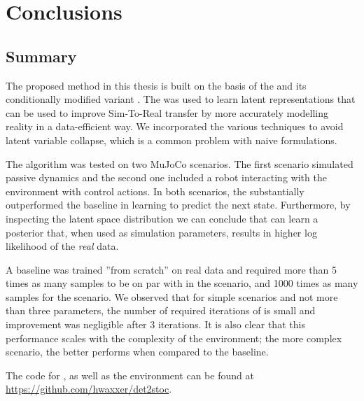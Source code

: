 \chapter{Conclusions}
\label{conclusions}

\section{Summary}

The proposed method in this thesis is built on the basis of the \vae{} and its conditionally modified variant \cvae{}. The \cvae{} was used to learn latent representations that can be used to improve Sim-To-Real transfer by more accurately modelling reality in a data-efficient way. We incorporated the various techniques to avoid latent variable collapse, which is a common problem with naive \cvae{} formulations. 

The \dettostoc{} algorithm was tested on two MuJoCo scenarios. The first scenario simulated passive dynamics and the second one included a robot interacting with the environment with control actions. In both scenarios, the \dettostoc{} substantially outperformed the baseline in learning to predict the next state. Furthermore, by inspecting the latent space distribution we can conclude that \dettostoc{} can learn a posterior that, when used as simulation parameters, results in higher log likelihood of the \emph{real} data. %

A baseline \cvae{} was trained ''from scratch'' on real data and required more than 5 times as many samples to be on par with \dettostoc{} in the \ws{} scenario, and 1000 times as many samples for the \yp{} scenario. We observed that for simple scenarios and not more than three parameters, the number of required iterations of \dettostoc{} is small and improvement was negligible after 3 iterations. It is also clear that this performance scales with the complexity of the environment; the more complex scenario, the better \dettostoc{} performs when compared to the baseline.


The code for \dettostoc{}, as well as the \ws{} environment can be found at \url{https://github.com/hwaxxer/det2stoc}. 

